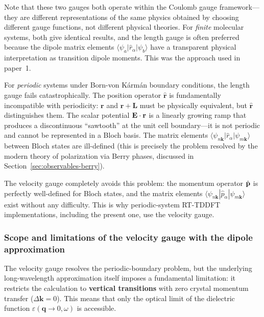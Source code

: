 \medskip
\noindent
Note that these two gauges both operate within the Coulomb gauge
framework---they are different representations of the same physics
obtained by choosing different gauge functions, not different
physical theories.
For \emph{finite} molecular systems, both give identical results,
and the length gauge is often preferred because the dipole matrix
elements $\langle\psi_a|\hat{r}_\alpha|\psi_b\rangle$ have a
transparent physical interpretation as transition dipole moments.
This was the approach used in paper~1.\cite{jakowski-tddft-2025}

For \emph{periodic} systems under Born-von K\'{a}rm\'{a}n boundary
conditions, the length gauge fails catastrophically.
The position operator $\hat{\mathbf{r}}$ is fundamentally
incompatible with periodicity: $\mathbf{r}$ and $\mathbf{r}+\mathbf{L}$
must be physically equivalent, but $\hat{\mathbf{r}}$ distinguishes
them.
The scalar potential $\mathbf{E}\cdot\mathbf{r}$ is a linearly growing
ramp that produces a discontinuous ``sawtooth'' at the unit cell
boundary---it is not periodic and cannot be represented in a Bloch
basis.
The matrix elements
$\langle\psi_{n\mathbf{k}}|\hat{r}_\alpha|\psi_{m\mathbf{k}}\rangle$
between Bloch states are ill-defined (this is precisely the problem
resolved by the modern theory of polarization via Berry phases,
discussed in Section~\ref{sec:observables-berry}).

The velocity gauge completely avoids this problem: the momentum
operator $\hat{\mathbf{p}}$ is perfectly well-defined for Bloch states, and the
matrix elements
$\langle\psi_{n\mathbf{k}}|\hat{p}_\alpha|\psi_{m\mathbf{k}}\rangle$
exist without any difficulty.  This is why periodic-system RT-TDDFT
implementations, including the present one, use the velocity gauge.


\subsubsection{Scope and limitations of the velocity gauge with the
               dipole approximation}
\label{sec:vg-scope}

The velocity gauge resolves the periodic-boundary problem, but the
underlying long-wavelength approximation itself imposes a
fundamental limitation: it restricts the calculation to
\textbf{vertical transitions} with zero crystal momentum transfer
($\Delta\mathbf{k} = 0$).  This means that only the optical limit
of the dielectric function $\varepsilon(\mathbf{q}\to 0,\omega)$ is
accessible.

